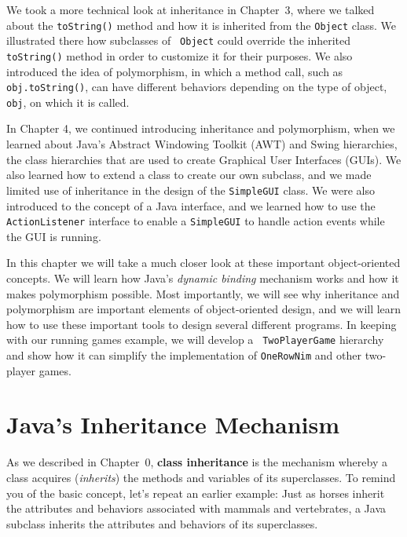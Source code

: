 We took a more technical look at inheritance in Chapter~3, where we
talked about the {\tt toString()} method and how it is inherited from
the {\tt Object} class. We illustrated there how subclasses of {\tt
Object} could override the inherited {\tt toString()} method in order
to customize it for their purposes. We also introduced the idea of
polymorphism, in which a method call, such as {\tt obj.toString()},
can have different behaviors depending on the type of object, {\tt
obj}, on which it is called.

In Chapter 4, we continued introducing inheritance and polymorphism,
when we learned about Java's Abstract Windowing Toolkit (AWT) and
Swing hierarchies, the class hierarchies that are used to create
Graphical User Interfaces (GUIs).  We also learned how to extend a
class to create our own subclass, and we made limited use of
inheritance in the design of the {\tt SimpleGUI} class.  We were also
introduced to the concept of a Java interface, and we learned how to
use the {\tt ActionListener} interface to enable a {\tt SimpleGUI} to
handle action events while the GUI is running.

In this chapter we will take a much closer look at these important
object-oriented concepts.  We will learn how Java's {\em dynamic
binding} mechanism works and how it makes polymorphism possible.  Most
importantly, we will see why inheritance and polymorphism are
important elements of object-oriented design, and we will learn how to
use these important tools to design several different programs.  In
keeping with our running games example, we will develop a {\tt
TwoPlayerGame} hierarchy and show how it can simplify the
implementation of {\tt OneRowNim} and other two-player games.

\section{Java's Inheritance Mechanism}

As we described in Chapter~0, {\bf class inheritance} is the mechanism
whereby a class acquires ({\em inherits}) the methods and variables of
its superclasses.  To remind you of the basic concept, let's repeat an
earlier example: Just as horses inherit the attributes and behaviors
associated with mammals and vertebrates, a Java subclass inherits the
attributes and behaviors of its superclasses.


